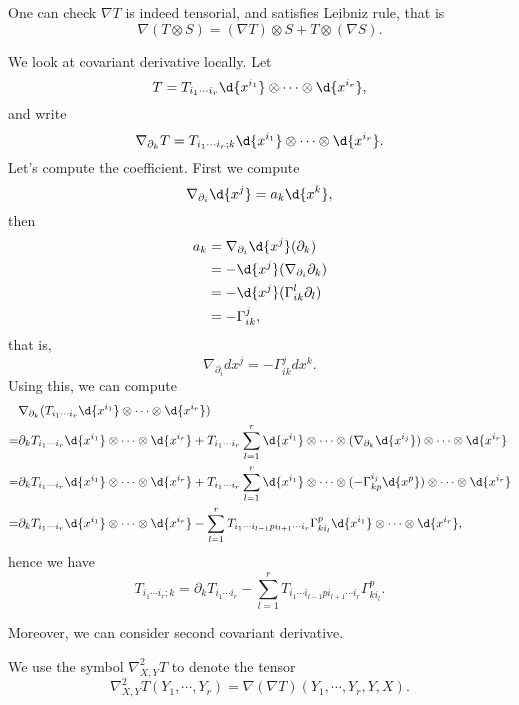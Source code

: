 One can check $\nabla T$ is indeed tensorial, and satisfies Leibniz rule, that is
\[\nabla(T\otimes S)=(\nabla T)\otimes S+T\otimes(\nabla S).\]

We look at covariant derivative locally.
Let
\[T=T_{i_1\cdots i_r}\d{x^{i_1}}\otimes\cdots\otimes\d{x^{i_r}},\]
and write
\[\nabla_{\partial_k}T=T_{i_1\cdots i_r;k}\d{x^{i_1}}\otimes\cdots\otimes\d{x^{i_r}}.\]
Let's compute the coefficient. First we compute
\[\nabla_{\partial_i}\d{x^j}=a_k\d{x^k},\]
then
\begin{align*}
    a_k&=\nabla_{\partial_i}\d{x^j}(\partial_k)\\
    &=-\d{x^j}(\nabla_{\partial_i}\partial_k)\\
    &=-\d{x^j}(\Gamma^l_{ik}\partial_l)\\
    &=-\Gamma^j_{ik},
\end{align*}
that is,
\[\nabla_{\partial_i}d{x^j}=-\Gamma^j_{ik}d{x^k}.\]
Using this, we can compute
\begin{align*}
    &\nabla_{\partial_k}(T_{i_1\cdots i_r}\d{x^{i_1}}\otimes\cdots\otimes\d{x^{i_r}})\\
    =&\partial_kT_{i_1\cdots i_r}\d{x^{i_1}}\otimes\cdots\otimes\d{x^{i_r}}+T_{i_1\cdots i_r}\sum_{l=1}^r\d{x^{i_1}}\otimes\cdots\otimes(\nabla_{\partial_k}\d{x^{i_j}})\otimes\cdots\otimes\d{x^{i_r}}\\
    =&\partial_kT_{i_1\cdots i_r}\d{x^{i_1}}\otimes\cdots\otimes\d{x^{i_r}}+T_{i_1\cdots i_r}\sum_{l=1}^r\d{x^{i_1}}\otimes\cdots\otimes(-\Gamma^{i_j}_{kp}\d{x^p})\otimes\cdots\otimes\d{x^{i_r}}\\
    =&\partial_kT_{i_1\cdots i_r}\d{x^{i_1}}\otimes\cdots\otimes\d{x^{i_r}}-\sum_{l=1}^rT_{i_1\cdots i_{l-1}pi_{l+1}\cdots i_r}\Gamma^p_{ki_l}\d{x^{i_1}}\otimes\cdots\otimes\d{x^{i_r}},
\end{align*}
hence we have
\[T_{i_1\cdots i_r;k}=\partial_kT_{i_1\cdots i_r}-\sum_{l=1}^rT_{i_1\cdots i_{l-1}pi_{l+1}\cdots i_r}\Gamma^p_{ki_l}.\]

Moreover, we can consider second covariant derivative.
\begin{symb}
    We use the symbol $\nabla^2_{X,Y}T$ to denote the tensor 
    \[\nabla^2_{X,Y}T(Y_1,\cdots,Y_r)=\nabla(\nabla T)(Y_1,\cdots,Y_r,Y,X).\]
\end{symb}

